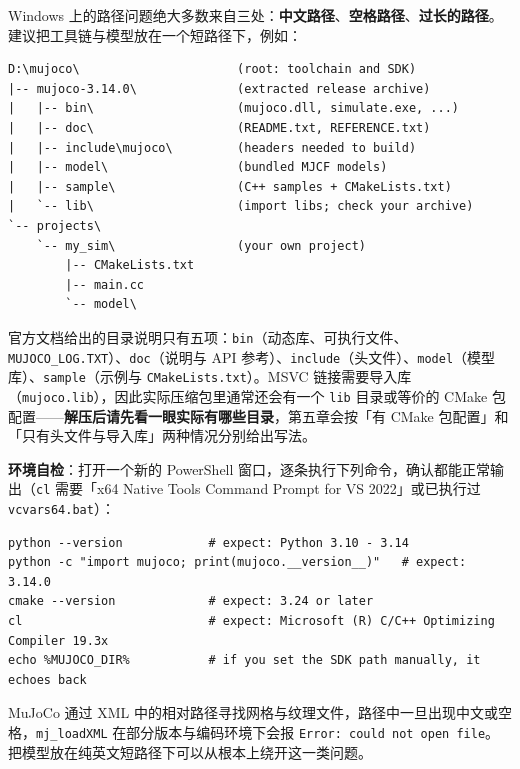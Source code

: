 Windows 上的路径问题绝大多数来自三处：\textbf{中文路径}、\textbf{空格路径}、\textbf{过长的路径}。建议把工具链与模型放在一个短路径下，例如：

\begin{lstlisting}[style=code]
D:\mujoco\                      (root: toolchain and SDK)
|-- mujoco-3.14.0\              (extracted release archive)
|   |-- bin\                    (mujoco.dll, simulate.exe, ...)
|   |-- doc\                    (README.txt, REFERENCE.txt)
|   |-- include\mujoco\         (headers needed to build)
|   |-- model\                  (bundled MJCF models)
|   |-- sample\                 (C++ samples + CMakeLists.txt)
|   `-- lib\                    (import libs; check your archive)
`-- projects\
    `-- my_sim\                 (your own project)
        |-- CMakeLists.txt
        |-- main.cc
        `-- model\
\end{lstlisting}

官方文档给出的目录说明只有五项：\texttt{bin}（动态库、可执行文件、\texttt{MUJOCO\_LOG.TXT}）、\texttt{doc}（说明与 API 参考）、\texttt{include}（头文件）、\texttt{model}（模型库）、\texttt{sample}（示例与 \texttt{CMakeLists.txt}）。MSVC 链接需要导入库（\texttt{mujoco.lib}），因此实际压缩包里通常还会有一个 \texttt{lib} 目录或等价的 CMake 包配置——\textbf{解压后请先看一眼实际有哪些目录}，第五章会按「有 CMake 包配置」和「只有头文件与导入库」两种情况分别给出写法。

\textbf{环境自检}：打开一个新的 PowerShell 窗口，逐条执行下列命令，确认都能正常输出（\texttt{cl} 需要「x64 Native Tools Command Prompt for VS 2022」或已执行过 \texttt{vcvars64.bat}）：

\begin{lstlisting}[style=shell]
python --version            # expect: Python 3.10 - 3.14
python -c "import mujoco; print(mujoco.__version__)"   # expect: 3.14.0
cmake --version             # expect: 3.24 or later
cl                          # expect: Microsoft (R) C/C++ Optimizing Compiler 19.3x
echo %MUJOCO_DIR%           # if you set the SDK path manually, it echoes back
\end{lstlisting}

\begin{tipbox}[为什么要用短路径]
	MuJoCo 通过 XML 中的相对路径寻找网格与纹理文件，路径中一旦出现中文或空格，\texttt{mj\_loadXML} 在部分版本与编码环境下会报
	\texttt{Error: could not open file}。把模型放在纯英文短路径下可以从根本上绕开这一类问题。
\end{tipbox}
